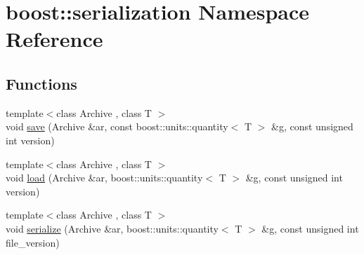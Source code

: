 \hypertarget{namespaceboost_1_1serialization}{\section{boost\-:\-:serialization Namespace Reference}
\label{namespaceboost_1_1serialization}
}
\subsection*{Functions}
\begin{DoxyCompactItemize}
\item 
{\footnotesize template$<$class Archive , class T $>$ }\\void \hyperlink{namespaceboost_1_1serialization_a8b18acb08566610b11320641dd959e91}{save} (Archive \&ar, const boost\-::units\-::quantity$<$ T $>$ \&g, const unsigned int version)
\item 
{\footnotesize template$<$class Archive , class T $>$ }\\void \hyperlink{namespaceboost_1_1serialization_a83faef3c98a4142f91a60d27993a44bb}{load} (Archive \&ar, boost\-::units\-::quantity$<$ T $>$ \&g, const unsigned int version)
\item 
{\footnotesize template$<$class Archive , class T $>$ }\\void \hyperlink{namespaceboost_1_1serialization_a270816c2d1606a727f39dadc6728a473}{serialize} (Archive \&ar, boost\-::units\-::quantity$<$ T $>$ \&g, const unsigned int file\-\_\-version)
\end{DoxyCompactItemize}


